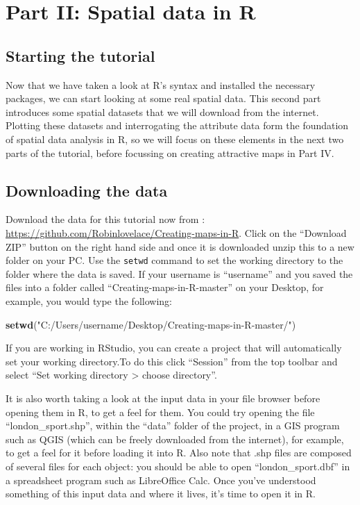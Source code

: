 \documentclass[]{article}
\newenvironment{Shaded}{}{}
\newcommand{\KeywordTok}[1]{\textcolor[rgb]{0.00,0.44,0.13}{\textbf{{#1}}}}
\newcommand{\StringTok}[1]{\textcolor[rgb]{0.25,0.44,0.63}{{#1}}}
\newcommand{\NormalTok}[1]{{#1}}
\begin{document}
\section{Part II: Spatial data in R}\label{part-ii-spatial-data-in-r}

\subsection{Starting the tutorial}\label{starting-the-tutorial}

Now that we have taken a look at R's syntax and installed the necessary
packages, we can start looking at some real spatial data. This second
part introduces some spatial datasets that we will download from the
internet. Plotting these datasets and interrogating the attribute data
form the foundation of spatial data analysis in R, so we will focus on
these elements in the next two parts of the tutorial, before focussing
on creating attractive maps in Part IV.

\subsection{Downloading the data}\label{downloading-the-data}

Download the data for this tutorial now from :
\url{https://github.com/Robinlovelace/Creating-maps-in-R}. Click on the
``Download ZIP'' button on the right hand side and once it is downloaded
unzip this to a new folder on your PC. Use the \texttt{setwd} command to
set the working directory to the folder where the data is saved. If your
username is ``username'' and you saved the files into a folder called
``Creating-maps-in-R-master'' on your Desktop, for example, you would
type the following:

\begin{Shaded}
\begin{Highlighting}[]
\KeywordTok{setwd}\NormalTok{(}\StringTok{"C:/Users/username/Desktop/Creating-maps-in-R-master/"}\NormalTok{)}
\end{Highlighting}
\end{Shaded}

If you are working in RStudio, you can create a project that will
automatically set your working directory.To do this click ``Session''
from the top toolbar and select ``Set working directory \textgreater{}
choose directory''.

It is also worth taking a look at the input data in your file browser
before opening them in R, to get a feel for them. You could try opening
the file ``london\_sport.shp'', within the ``data'' folder of the
project, in a GIS program such as QGIS (which can be freely downloaded
from the internet), for example, to get a feel for it before loading it
into R. Also note that .shp files are composed of several files for each
object: you should be able to open ``london\_sport.dbf'' in a
spreadsheet program such as LibreOffice Calc. Once you've understood
something of this input data and where it lives, it's time to open it in
R.
\end{document}
